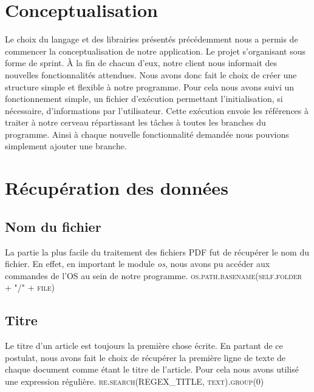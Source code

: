 \documentclass[12pt, final]{article}
\begin{document}
    \section{\fontsection Conceptualisation}
        Le choix du langage et des librairies présentés précédemment nous a permis de commencer la conceptualisation de notre application. Le projet s'organisant sous forme de sprint. À la fin de chacun d'eux, notre client nous informait des nouvelles fonctionnalités attendues. Nous avons donc fait le choix de créer une structure simple et flexible à notre programme.\newline
        Pour cela nous avons suivi un fonctionnement simple, un fichier d'exécution permettant l'initialisation, si nécessaire, d'informations par l'utilisateur. Cette exécution envoie les références à traiter à notre cerveau répartissant les tâches à toutes les branches du programme. Ainsi à chaque nouvelle fonctionnalité demandée nous pouvions simplement ajouter une branche.
    
    \section{\fontsection Récupération des données}
        \subsection{\fontsubsection Nom du fichier}
        La partie la plus facile du traitement des fichiers PDF fut de récupérer le nom du fichier. En effet, en important le module \textit{os}, nous avons pu accéder aux commandes de l'OS au sein de notre programme.\newline
        \textsc{os.path.basename(self.folder + "/" + file)}
        
        \subsection{\fontsubsection Titre}
        Le titre d'un article est toujours la première chose écrite. En partant de ce postulat, nous avons fait le choix de récupérer la première ligne de texte de chaque document comme étant le titre de l'article. Pour cela nous avons utilisé une expression régulière.
        \textsc{re.search(REGEX\_TITLE, text).group(0)}
\end{document}
